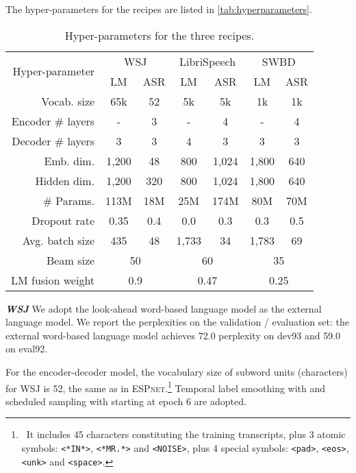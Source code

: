 \documentclass{article}
\def\espnet{\textsc{ESPnet}\xspace}
\begin{document}
The hyper-parameters for the recipes are listed in \autoref{tab:hyperparameters}. 
\begin{table}[tb]
    \centering
    \caption{Hyper-parameters for the three recipes.}
    \begin{adjustbox}{max width=\linewidth}
    \begin{tabular}{rcccccc}
        \toprule
        \multirow{2}{*}{Hyper-parameter} & \multicolumn{2}{c}{WSJ} & \multicolumn{2}{c}{LibriSpeech} & \multicolumn{2}{c}{SWBD} \\
        \cmidrule(lr){2-3} \cmidrule(lr){4-5} \cmidrule(lr){6-7}
        & LM & ASR & LM & ASR & LM & ASR \\
        \midrule
        Vocab. size  & 65k & 52 & 5k & 5k & 1k & 1k \\
        Encoder \# layers & - & 3 & - & 4 & - & 4 \\
        Decoder \# layers & 3 & 3 & 4 & 3 & 3 & 3 \\
        Emb. dim.  & 1,200  & 48 & 800 & 1,024 & 1,800 & 640\\
        Hidden dim. & 1,200  & 320 & 800 & 1,024 & 1,800 & 640\\
        \# Params. & 113M & 18M & 25M & 174M & 80M & 70M\\
        Dropout rate     & 0.35   & 0.4 & 0.0 & 0.3 & 0.3 & 0.5\\
        Avg. batch size & 435 & 48 & 1,733 & 34 & 1,783 & 69\\
        \midrule
        Beam size & \multicolumn{2}{c}{50} & \multicolumn{2}{c}{60} & \multicolumn{2}{c}{35} \\
        LM fusion weight & \multicolumn{2}{c}{0.9} & \multicolumn{2}{c}{0.47} & \multicolumn{2}{c}{0.25} \\
        \bottomrule
    \end{tabular}
    \end{adjustbox}
    \label{tab:hyperparameters}
\end{table}



\vspace{0.2cm}
\noindent \textbf{\textit{WSJ}}\quad
We adopt the look-ahead word-based language model \cite{hori2018endtoend} as the external language model. We report the perplexities on the validation / evaluation set: the external word-based language model achieves 72.0 perplexity on dev93 and 59.0 on eval92. 

For the encoder-decoder model, the vocabulary size of subword units (characters) for WSJ is 52, the same as in \espnet.\footnote{~It includes 45 characters constituting the training transcripts, plus 3 atomic symbols: \texttt{<*IN*>}, \texttt{<*MR.*>} and \texttt{<NOISE>}, plus 4 special symbols: \texttt{<pad>}, \texttt{<eos>}, \texttt{<unk>} and \texttt{<space>}.} Temporal label smoothing with  and scheduled sampling with  starting at epoch 6 are adopted. 
\end{document}
